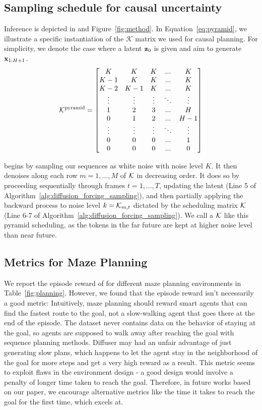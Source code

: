 \subsection{Sampling schedule for causal uncertainty}
Inference is depicted in  and Figure~\ref{fig:method}. In Equation~\ref{eq:pyramid}, we illustrate a specific instantiation of the $\mathcal{K}$ matrix we used for causal planning. For simplicity, we denote the case where a latent $\mathbf{z}_0$ is given and aim to generate $\mathbf{x}_{1:H+1}$. 
\begin{align}
\mathcal{K}^{\mathrm{pyramid}}=
\begin{bmatrix}
K & K & K & ... & K\\
K-1 & K & K & ... & K\\
K-2 & K-1 & K & ... & K\\
\vdots& \vdots &\vdots  &\ddots & \vdots \\
1 & 2 & 3 & ... & H \\
0 & 1 & 2 & ... & H-1 \\
\vdots& \vdots &\vdots  &\ddots & \vdots \\
0 & 0 & 0 & ... & 1 \\
0 & 0 & 0 & ... & 0
\end{bmatrix} 
\label{eq:pyramid}
\end{align}

\algo{} begins by sampling our sequences as white noise with noise level $K$. It then denoises along each row $m=1,\dots, M$ of $\mathcal{K}$ in decreasing order. It does so by proceeding sequentially through frames $t=1,\dots, T $, updating the latent (Line 5 of Algorithm~\ref{alg:diffusion_forcing_sampling}), and then partially applying the backward process to noise level $k = \mathcal{K}_{m,t}$ dictated by the scheduling matrix $\mathcal{K}$  (Line 6-7 of Algorithm~\ref{alg:diffusion_forcing_sampling}). We call a $\mathcal{K}$ like this pyramid scheduling, as the tokens in the far future are kept at higher noise level than near future.

\subsection{Metrics for Maze Planning}
We report the episode reward of \algo{} for different maze planning environments in Table~\ref{fig:planning}. However, we found that the episode reward isn't necessarily a good metric: Intuitively, maze planning should reward smart agents that can find the fastest route to the goal, not a slow-walking agent that goes there at the end of the episode. The dataset never contains data on the behavior of staying at the goal, so agents are supposed to walk away after reaching the goal with sequence planning methods. Diffuser may had an unfair advantage of just generating slow plans, which happens to let the agent stay in the neighborhood of the goal for more steps and get a very high reward as a result. This metric seems to exploit flaws in the environment design - a good design would involve a penalty of longer time taken to reach the goal. Therefore, in future works based on our paper, we encourage alternative metrics like the time it takes to reach the goal for the first time, which \algo{} excels at.


